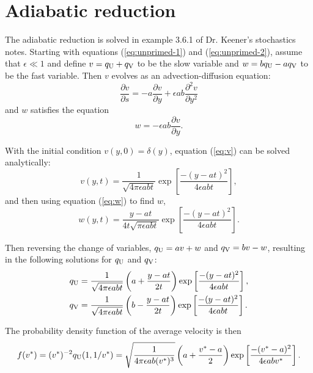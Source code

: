 \documentclass{article}
\newcommand{\tn}{\textnormal}
\newcommand{\Pder}[2]{\frac{\partial #1}{\partial #2}}
\begin{document}
\section{Adiabatic reduction}
\label{sec:adb-red}

The adiabatic reduction is solved in example 3.6.1 of Dr. Keener's
stochastics notes. Starting with equations (\ref{eq:unprimed-1}) and
(\ref{eq:unprimed-2}), assume that $\epsilon \ll 1$ and define $v =
q_\tn{U} + q_\tn{V}$ to be the slow variable and $w = b q_\tn{U} - a
q_\tn{V}$ to be the fast variable. Then $v$ evolves as an
advection-diffusion equation:
\begin{equation}
  \label{eq:v}
  \Pder{v}{s} = -a \Pder{v}{y} + \epsilon a b \frac{\partial^2
    v}{\partial y^2}
\end{equation}
and $w$ satisfies the equation
\begin{equation}
  \label{eq:w}
  w = -\epsilon a b \Pder{v}{y}.
\end{equation}

With the initial condition $v(y, 0) = \delta(y)$, equation
(\ref{eq:v}) can be solved analytically:
\begin{equation}
  \label{eq:v-soln}
  v(y, t) = \frac{1}{\sqrt{4 \pi \epsilon a b t}} \exp \left[ \frac{-(y
      - at)^2}{4 \epsilon a b t} \right],
\end{equation}
and then using equation (\ref{eq:w}) to find $w$,
\begin{equation}
  \label{eq:w-soln}
  w(y, t) = \frac{y - at}{4t\sqrt{\pi \epsilon a b t}} \exp \left[ \frac{-(y
      - at)^2}{4 \epsilon a b t} \right].
\end{equation}

Then reversing the change of variables, $q_\tn{U} = av + w$ and
$q_\tn{V} = bv - w$, resulting in the following solutions for
$q_\tn{U}$ and $q_\tn{V}$:
\begin{align}
  \label{eq:qu-soln}
  q_\tn{U} &= \frac{1}{\sqrt{4 \pi \epsilon a b t}} \left(a + \frac{y
             - at}{2t} \right) \exp \left[ \frac{-(y - at)^2}{4
             \epsilon a b t} \right], \\
  \label{eq:qv-soln}
  q_\tn{V} &= \frac{1}{\sqrt{4 \pi \epsilon a b t}} \left(b - \frac{y
             - at}{2t} \right) \exp \left[ \frac{-(y - at)^2}{4
             \epsilon a b t} \right].
\end{align}

The probability density function of the average velocity is then
\begin{equation}
  \label{eq:vel-dens}
  f(v^*) = (v^*)^{-2} q_\tn{U}(1, 1/v^*) = \sqrt{\frac{1}{4 \pi
      \epsilon a b (v^*)^3}}
  \left(a + \frac{v^* - a}{2} \right) \exp\left[ \frac{-(v^* -
      a)^2}{4\epsilon a b v^*} \right].
\end{equation}
\end{document}
